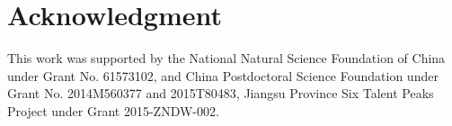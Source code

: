 \documentclass[conference]{IEEEtran}
\begin{document}
\section*{Acknowledgment}
This work was supported by the National Natural Science Foundation of China under Grant No. 61573102, and China Postdoctoral Science Foundation under Grant No. 2014M560377 and 2015T80483, Jiangsu Province Six Talent Peaks Project under Grant 2015-ZNDW-002.



\end{document}
